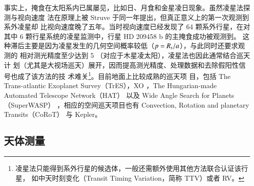 事实上，掩食在太阳系内已属屡见，比如日、月食和金星凌日现象。虽然凌星法探测与视向速度
法在原理上被 Struve 于同一年提出\cite{Struve1952}，但真正意义上的第一次观测到系外凌星却
比视向速度晚了五年\cite{Seager2010exobook}。当时视向速度已经发现了 64 颗系外行星，在对
其中 6 颗行星系统的凌星监测中，行星 HD 209458 b 的主掩食成功被观测到\cite{Henryetal2000, Charbonneauetal2000}。
这种滞后主要是因为凌星发生的几何空间概率较低（$p = R_\mathrm{s} / a$），与此同时还要求观测的
相对测光精度至少达到 5 \textperthousand（对应于木星凌太阳），凌星法也因此通常结合巡天计
划（尤其是大视场巡天）展开，因而提高测光精度、处理数据和去除假阳性信号也成了该方法的技
术难关\footnote{凌星法只能得到系外行星的候选体，一般还需额外使用其他方法联合认证该行星，
如中天时刻变化（Transit Timing Variation，简称 TTV）或者 RV。}。目前地面上比较成熟的巡天项
目，包括 The Trans-atlantic Exoplanet Survey（TrES）\cite{Alonsoetal2004TrES}，XO
\cite{McCulloughetal2005XO}，The Hungarian-made Automated Telescope Network（HAT）
\cite{Bakosetal2007HAT} 以及 Wide Angle Search for Planets（SuperWASP）
\cite{Pollaccoetal2006WASP}，相应的空间巡天项目也有 Convection, Rotation and planetary 
Transits（CoRoT）\cite{Bargeetal2008CoRoT} 与 Kepler\cite{Boruckietal2010}。


\subsection{天体测量}

